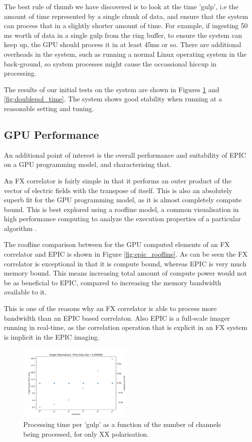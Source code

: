 \documentclass[bibliography=totocnumbered, twocolumn]{article}
\begin{document}
The best rule of thumb we have discovered is to look at the time
'gulp', i.e the amount of time represented by a single chunk of
data, and ensure that the system can process that in a slightly
shorter amount of time. For example, if ingesting 50 ms worth
of data in a single gulp from the ring buffer, to ensure the
system can keep up, the GPU should process it in at least 45ms
or so. There are additional overheads in the system, such as
running a normal Linux operating system in the back-ground,
so system processes might cause the occassional hiccup in
processing.

The results of our initial tests on the system are shown in
Figures \ref{fig:singlepol_time} and \ref{fig:doublepol_time}. The
system shows good stability when running at a reasonable setting
and tuning.

\subsection{GPU Performance}

An additional point of interest is the overall performance and
suitability of EPIC on a GPU programming model, and characterising
that.

An FX correlator is fairly simple in that it performs an outer
product of the vector of electric fields with the transpose of
itself. This is also an absolutely superb fit for the GPU
programming model, as it is almost completely compute bound. This
is best explored using a roofline model, a common visualisation in
high performance computing to analyze the execution properties
of a particular algorithm \citep{demmel_roofline:_2008}.

The roofline comparison between for the GPU computed elements of an
FX correlator and EPIC is shown in Figure \ref{fig:epic_roofline}.
As can be seen the FX correlator is exceptional in that it is
compute bound, whereas EPIC is very much memory bound. This means
increasing total amount of compute power would not be as beneficial
to EPIC, compared to increasing the memory bandwidth available to it.

This is one of the reasons why an FX correlator is able to process
more bandwidth than an EPIC based correlaton. Also EPIC is a
full-scale imager running in real-time, as the correlation
operation that is explicit in an FX system is implicit in the
EPIC imaging. 

\begin{figure}
  \centering
  \includegraphics[width=0.5\textwidth]{images/single_pol_throughput.pdf}
  \caption{Processing time per 'gulp' as a function of the number of channels being processed, for only XX polarisation.}
  \label{fig:singlepol_time}
\end{figure}
\end{document}
